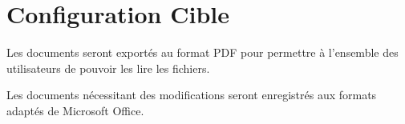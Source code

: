 \section{Configuration Cible}

Les documents seront exportés au format PDF pour permettre à l'ensemble 
des utilisateurs de pouvoir les lire les fichiers.

Les documents nécessitant des modifications seront enregistrés aux formats
adaptés de Microsoft Office.
